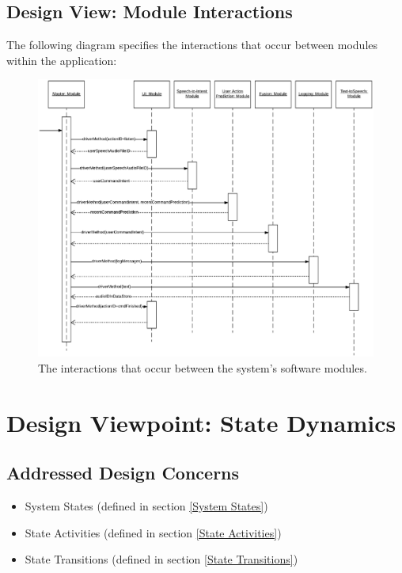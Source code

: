 \documentclass[onecolumn, draftclsnofoot,10pt, compsoc]{IEEEtran}
\newcommand{\designConcernRef}[1]{
    #1 (defined in section \ref{#1})
}
\begin{document}
    \subsection{Design View: Module Interactions}
        The following diagram specifies the interactions that occur between modules within the application: 
		\begin{figure}[H]
			\includegraphics[width=1\textwidth, height=.6\textheight]{ModuleInteractionsUML.eps}
			\centering
			\caption{The interactions that occur between the system's software modules.}
			\label{fig::moduleInteractions}
		\end{figure}

\section{Design Viewpoint: State Dynamics}
	\subsection{Addressed Design Concerns}
		\begin{itemize}
			\item \designConcernRef{System States}
			\item \designConcernRef{State Activities}
			\item \designConcernRef{State Transitions}
		\end{itemize}
		
\end{document}
